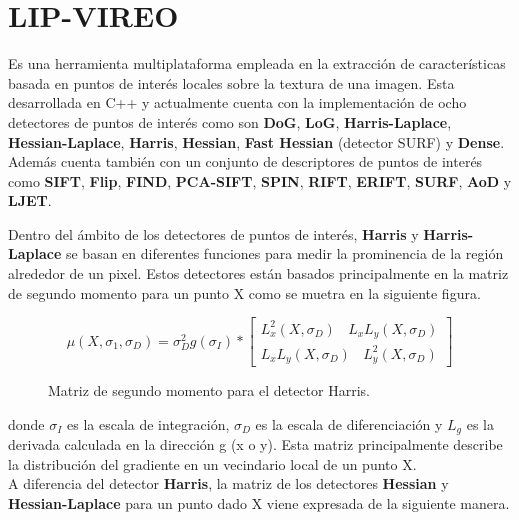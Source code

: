 
\section{LIP-VIREO}

Es una herramienta multiplataforma empleada en la extracción de características basada en puntos de interés locales sobre la textura de una imagen. Esta desarrollada en C++ y actualmente cuenta con la implementación de ocho detectores de puntos de interés como son \textbf{DoG}, \textbf{LoG}, \textbf{Harris-Laplace}, \textbf{Hessian-Laplace}, \textbf{Harris}, \textbf{Hessian}, \textbf{Fast Hessian} (detector SURF) y \textbf{Dense}. Además cuenta también con un conjunto de descriptores de puntos de interés como \textbf{SIFT}, \textbf{Flip}, \textbf{FIND}, \textbf{PCA-SIFT}, \textbf{SPIN}, \textbf{RIFT}, \textbf{ERIFT}, \textbf{SURF}, \textbf{AoD} y \textbf{LJET}.

Dentro del ámbito de los detectores de puntos de interés, \textbf{Harris} y \textbf{Harris-Laplace} se basan en diferentes funciones para medir la prominencia de la región alrededor de un pixel. Estos detectores están basados principalmente en la matriz de segundo momento para un punto X como se muetra en la siguiente figura.

\begin{figure}[htbp]
\centering
\[
\mu \left ( X,\sigma _{1},  \sigma _{D}\right ) = \sigma ^{2}_{D}g(\sigma _{I}) * \begin{bmatrix}
L^{2}_{x}(X,\sigma _{D}) \:\:\:\: L_{x}L_{y}(X,\sigma _{D}) \\
L_{x}L_{y}(X,\sigma _{D}) \:\:\:\: L^{2}_{y}(X,\sigma _{D})
\end{bmatrix}
\] 
\caption{Matriz de segundo momento para el detector Harris.} 
\end{figure}

donde $\sigma _{I}$ es la escala de integración, $\sigma _{D}$ es la escala de diferenciación y $L_{g}$ es la derivada calculada en la dirección g (x o y). Esta matriz principalmente describe la distribución del gradiente en un vecindario local de un punto X. \\

A diferencia del detector \textbf{Harris}, la matriz de los detectores \textbf{Hessian} y \textbf{Hessian-Laplace} para un punto dado X viene expresada de la siguiente manera. \\


